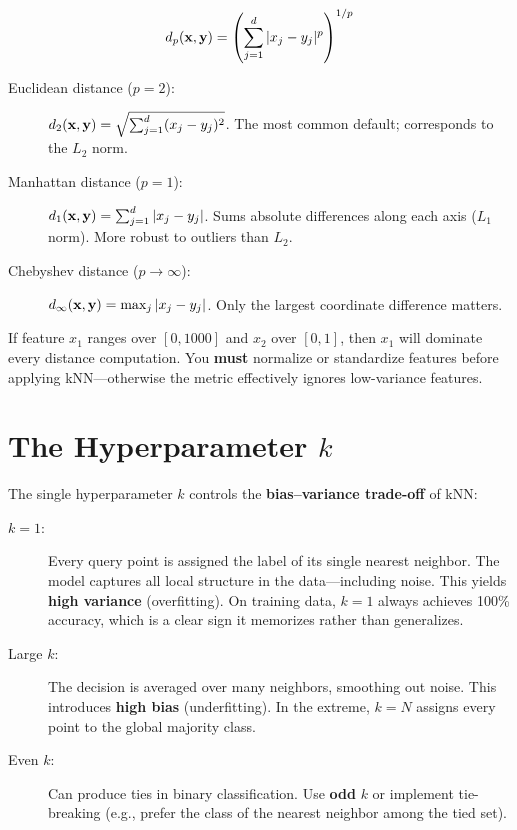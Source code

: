 \begin{definition}
$$d_p(\mathbf{x}, \mathbf{y}) = \left( \sum_{j=1}^{d} |x_j - y_j|^p \right)^{1/p}$$
\end{definition}

\begin{description}
    \item[Euclidean distance ($p=2$):] $d_2(\mathbf{x}, \mathbf{y}) = \sqrt{\sum_{j=1}^{d} (x_j - y_j)^2}$. The most common default; corresponds to the $L_2$ norm.
    \item[Manhattan distance ($p=1$):] $d_1(\mathbf{x}, \mathbf{y}) = \sum_{j=1}^{d} |x_j - y_j|$. Sums absolute differences along each axis ($L_1$ norm). More robust to outliers than $L_2$.
    \item[Chebyshev distance ($p \to \infty$):] $d_\infty(\mathbf{x}, \mathbf{y}) = \max_j |x_j - y_j|$. Only the largest coordinate difference matters.
\end{description}

\begin{remark}
If feature $x_1$ ranges over $[0, 1000]$ and $x_2$ over $[0, 1]$, then $x_1$ will dominate every distance computation. You \textbf{must} normalize or standardize features before applying kNN---otherwise the metric effectively ignores low-variance features.
\end{remark}

\section*{The Hyperparameter $k$}

The single hyperparameter $k$ controls the \textbf{bias--variance trade-off} of kNN:

\begin{description}
    \item[$k = 1$:] Every query point is assigned the label of its single nearest neighbor. The model captures all local structure in the data---including noise. This yields \textbf{high variance} (overfitting). On training data, $k{=}1$ always achieves 100\% accuracy, which is a clear sign it memorizes rather than generalizes.
    \item[Large $k$:] The decision is averaged over many neighbors, smoothing out noise. This introduces \textbf{high bias} (underfitting). In the extreme, $k = N$ assigns every point to the global majority class.
    \item[Even $k$:] Can produce ties in binary classification. Use \textbf{odd} $k$ or implement tie-breaking (e.g., prefer the class of the nearest neighbor among the tied set).
\end{description}

